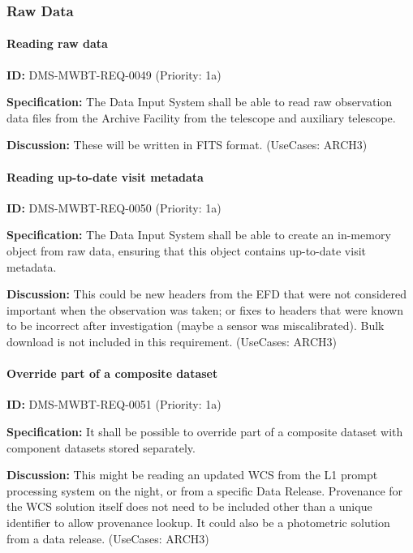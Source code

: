 \documentclass[SE,toc,lsstdraft]{lsstdoc}
\begin{document}
\subsubsection{Raw Data}

\paragraph{Reading raw data}\hfill  %

\label{DMS-MWBT-REQ-0049}
\textbf{ID:} DMS-MWBT-REQ-0049 (Priority: 1a)

\textbf{Specification:}
The Data Input System shall be able to read raw observation data files from the Archive Facility from the telescope and auxiliary telescope.

\textbf{Discussion:}
These will be written in FITS format. (UseCases: ARCH3)

\paragraph{Reading up-to-date visit metadata}\hfill  %

\label{DMS-MWBT-REQ-0050}
\textbf{ID:} DMS-MWBT-REQ-0050 (Priority: 1a)

\textbf{Specification:}
The Data Input System shall be able to create an in-memory object from raw data, ensuring that this object contains up-to-date visit metadata.

\textbf{Discussion:}
This could be new headers from the EFD that were not considered important when the observation was taken; or fixes to headers that were known to be incorrect after investigation (maybe a sensor was miscalibrated). Bulk download is not included in this requirement. (UseCases: ARCH3)

\paragraph{Override part of a composite dataset}\hfill  %

\label{DMS-MWBT-REQ-0051}
\textbf{ID:} DMS-MWBT-REQ-0051 (Priority: 1a)

\textbf{Specification:}
It shall be possible to override part of a composite dataset with component datasets stored separately.

\textbf{Discussion:}
This might be reading an updated WCS from the L1 prompt processing system on the night, or from a specific Data Release. Provenance for the WCS solution itself does not need to be included other than a unique identifier to allow provenance lookup. It could also be a photometric solution from a data release. (UseCases: ARCH3)
\end{document}
